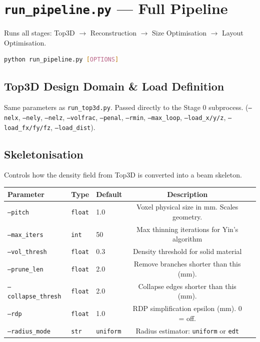 \documentclass[11pt,a4paper]{article}
\begin{document}
\section{\texttt{run\_pipeline.py} — Full Pipeline}

Runs all stages: Top3D $\xrightarrow{}$ Reconstruction $\xrightarrow{}$ Size Optimisation $\xrightarrow{}$ Layout Optimisation.

\begin{lstlisting}[language=bash]
python run_pipeline.py [OPTIONS]
\end{lstlisting}

\subsection{Top3D Design Domain \& Load Definition}
Same parameters as \texttt{run\_top3d.py}. Passed directly to the Stage 0 subprocess. (\texttt{--nelx}, \texttt{--nely}, \texttt{--nelz}, \texttt{--volfrac}, \texttt{--penal}, \texttt{--rmin}, \texttt{--max\_loop}, \texttt{--load\_x/y/z}, \texttt{--load\_fx/fy/fz}, \texttt{--load\_dist}).

\subsection{Skeletonisation}

Controls how the density field from Top3D is converted into a beam skeleton.

\begin{table}[h]
\centering
\begin{tabularx}{\textwidth}{lllcX}
\toprule
\textbf{Parameter} & \textbf{Type} & \textbf{Default} & \textbf{Description} \\
\midrule
\texttt{--pitch} & \texttt{float} & 1.0 & Voxel physical size in mm. Scales geometry. \\
\texttt{--max\_iters} & \texttt{int} & 50 & Max thinning iterations for Yin's algorithm \\
\texttt{--vol\_thresh} & \texttt{float} & 0.3 & Density threshold for solid material \\
\texttt{--prune\_len} & \texttt{float} & 2.0 & Remove branches shorter than this (mm). \\
\texttt{--collapse\_thresh} & \texttt{float} & 2.0 & Collapse edges shorter than this (mm). \\
\texttt{--rdp} & \texttt{float} & 1.0 & RDP simplification epsilon (mm). 0 = off. \\
\texttt{--radius\_mode} & \texttt{str} & \texttt{uniform} & Radius estimator: \texttt{uniform} or \texttt{edt} \\
\bottomrule
\end{tabularx}
\end{table}
\end{document}
